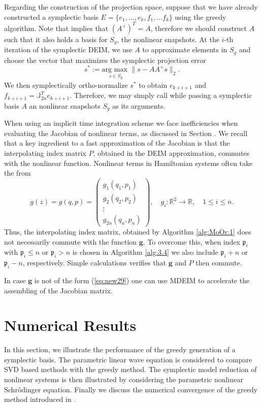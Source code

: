 Regarding the construction of the projection space, suppose that we have already constructed a symplectic basis $E=\{ e_1,\dots , e_k,f_1,\dots f_k \}$ using the greedy algorithm. Note that  implies that $(A^+)^T=A$, therefore we should construct $A$ such that it also holds a basis for $S_g$, the nonlinear snapshots. At the $i$-th iteration of the symplectic DEIM, we use $A$ to approximate elements in $S_{g}$ and choose the vector that maximizes the symplectic projection error 
\begin{equation}
	s^* := \underset{s \in S_{ g}}{\text{arg\ max }}\| s - AA^+ s \|_2.	
\end{equation}
We then symplectically ortho-normalize $s^*$ to obtain $e_{k+i+1}$ and $f_{k+i+1} = \mathbb J_{2n}^T e_{k+i+1}$. Therefore, we may simply call  while passing a symplectic basis $A$ an nonlinear snapshots $S_g$ as its arguments.

When using an implicit time integration scheme we face inefficiencies when evaluating the Jacobian of nonlinear terms, as discussed in Section . We recall that a key ingredient to a fast approximation of the Jacobian is that the interpolating index matrix $P$, obtained in the DEIM approximation, commutes with the nonlinear function. Nonlinear terms in Hamiltonian systems often take the from
\begin{equation} \label{eq:new29}
	g (z) = g (q,p) = 
	\begin{pmatrix}
		g_1(q_1,p_1) \\
		g_2(q_2,p_2) \\
		\vdots \\
		g_{2n}(q_{n},p_{n})
	\end{pmatrix}, \quad g_{i}:\mathbb R^{2}\to \mathbb R, \quad 1\leq i \leq n.
\end{equation}
Thus, the interpolating index matrix, obtained by Algorithm \ref{alg:MoOr:1} does not necessarily commute with the function $\mathbf g$. To overcome this, when index $\mathfrak p_i$ with $\mathfrak p_i\leq n$ or $\mathfrak p_i>n$ is chosen in Algorithm \ref{alg:3.4} we also include $\mathfrak p_i + n$ or $\mathfrak p_i-n$, respectively. Simple calculations verifies that $\mathbf g$ and $P$ then commute.

In case $\mathbf g$ is not of the form (\ref{eq:new29}) one can use MDEIM \cite{carlberg2012efficient,negri2015efficient} to accelerate the assembling of the Jacobian matrix.




\section{Numerical Results} \label{chap:NuRe:1}
In this section, we illustrate the performance of the greedy generation of a symplectic basis. The parametric linear wave equation is considered to compare SVD based methods with the greedy method. The symplectic model reduction of nonlinear systems is then illustrated by considering the parametric nonlinear Schr\"odinger equation. Finally we discuss the numerical convergence of the greedy method introduced in .

